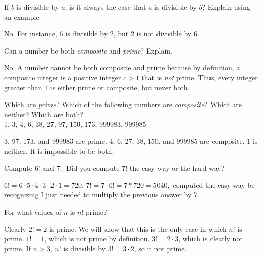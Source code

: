 \begin{requ}
If $b$ is divisible by $a$, is it always the case that $a$ is divisible by $b$? Explain using an example.
\begin{requanswer}
No. For instance, 6 is divisible by 2, but 2 is not divisible by 6. 
\end{requanswer}
\end{requ}

\begin{requ}
Can a number be both {\em composite} and {\em prime}? Explain.
\begin{requanswer}
No.
A number cannot be both composite and prime because by definition,
a composite integer is a positive integer $c>1$ that is {\em not} prime.
Thus, every integer greater than $1$ is either prime or composite, but never both.
\end{requanswer}
\end{requ}

\begin{requ}
Which are {\em prime}? 
Which of the following numbers are {\em composite}?
Which are neither? Which are both?\\
1, 3, 4, 6, 38, 27, 97, 150, 173, 999983, 999985
\begin{requanswer}
3, 97, 173, and 999983 are prime.
4, 6, 27, 38, 150, and 999985 are composite.
1 is neither. It is impossible to be both.
\end{requanswer}
\end{requ}


\begin{requ}
Compute $6!$ and $7!$. Did you compute $7!$ the easy way or the hard way?
\begin{requanswer}
$6!=6\cdot 5\cdot 4\cdot 3\cdot 2\cdot 1 = 720$.
$7!=7\cdot 6! = 7*720 =5040,$ computed the easy way
be recognizing I just needed to multiply the previous answer by 7.
\end{requanswer}
\end{requ}


\begin{requ}
For what values of $n$ is $n!$ prime?
\begin{requanswer}
Clearly $2!=2$ is prime.
We will show that this is the only case in which $n!$ is prime. 
$1!=1$, which is not prime by definition.
$3!=2\cdot 3$, which is clearly not prime.
If $n>3$, $n!$ is divisible by $3!=3\cdot 2$, so it not prime.
\end{requanswer}
\end{requ}

